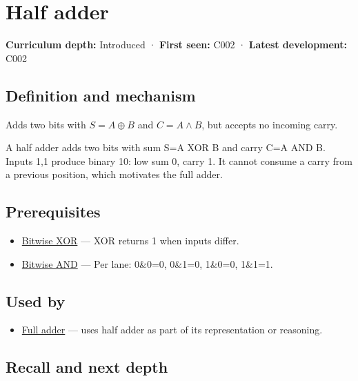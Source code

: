 \hypertarget{appendix-1652d27a8e90}{}\label{referencestart:appendix-1652d27a8e90}
\section{Half adder}\label{appendix-1652d27a8e90-half-adder}

\textbf{Curriculum depth:} Introduced · \textbf{First seen:} C002 · \textbf{Latest development:} C002

\subsection{Definition and mechanism}\label{appendix-1652d27a8e90-definition-and-mechanism}

Adds two bits with \(S=A\oplus B\) and \(C=A\land B\), but accepts no incoming carry.

A half adder adds two bits with sum S=A XOR B and carry C=A AND B. Inputs 1,1 produce binary 10: low sum 0, carry 1. It cannot consume a carry from a previous position, which motivates the full adder.

\subsection{Prerequisites}\label{appendix-1652d27a8e90-prerequisites}

\begin{itemize}
\tightlist
\item
  \hyperref[appendix-d49161831368]{Bitwise XOR} --- XOR returns 1 when inputs differ.
\item
  \hyperref[appendix-68b52453737c]{Bitwise AND} --- Per lane: 0\&0=0, 0\&1=0, 1\&0=0, 1\&1=1.
\end{itemize}

\subsection{Used by}\label{appendix-1652d27a8e90-used-by}

\begin{itemize}
\tightlist
\item
  \hyperref[appendix-d1a5b1e520c2]{Full adder} --- uses half adder as part of its representation or reasoning.
\end{itemize}

\subsection{Recall and next depth}\label{appendix-1652d27a8e90-recall-and-next-depth}

